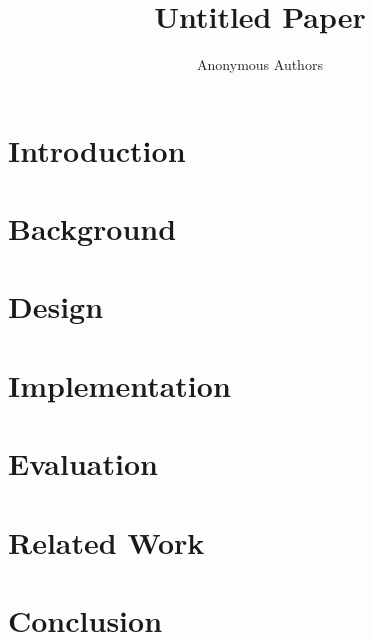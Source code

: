 \documentclass[letterpaper,twocolumn,10pt]{article}
\title{Untitled Paper}
\author{Anonymous Authors}
\begin{document}
\maketitle
\begin{abstract}
\end{abstract}
\section{Introduction}
\section{Background}
\section{Design}
\section{Implementation}
\section{Evaluation}
\section{Related Work}
\section{Conclusion}

\end{document}
